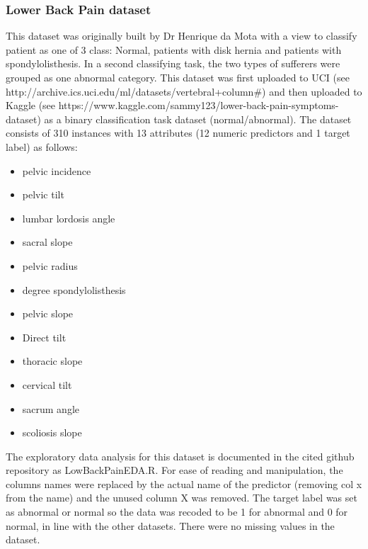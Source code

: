 \subsubsection{Lower Back Pain dataset}
This dataset was originally built by Dr Henrique da Mota with a view to classify patient as one of 3 class: Normal, patients with disk hernia and patients with spondylolisthesis. In a second classifying task, the two types of sufferers were grouped as one abnormal category. This dataset was first uploaded to UCI (see http://archive.ics.uci.edu/ml/datasets/vertebral+column#) and then uploaded to Kaggle (see https://www.kaggle.com/sammy123/lower-back-pain-symptoms-dataset) as a binary classification task dataset (normal/abnormal).\newline
The dataset consists of 310 instances with 13 attributes (12 numeric predictors and 1 target label) as follows:
\begin{itemize}
    \item pelvic incidence
    \item pelvic tilt
    \item lumbar lordosis angle
    \item sacral slope
    \item pelvic radius
    \item degree spondylolisthesis
    \item pelvic slope
    \item Direct tilt
    \item thoracic slope
    \item cervical tilt
    \item sacrum angle
    \item scoliosis slope
\end{itemize}

The exploratory data analysis for this dataset is documented in the cited github repository as LowBackPainEDA.R.\newline
For ease of reading and  manipulation, the columns names were replaced by the actual name of the predictor (removing col x from the name) and the unused column X was removed.\newline
The target label was set as abnormal or normal so the data was recoded to be 1 for abnormal and 0 for normal, in line with the other datasets.
There were no missing values in the dataset.

